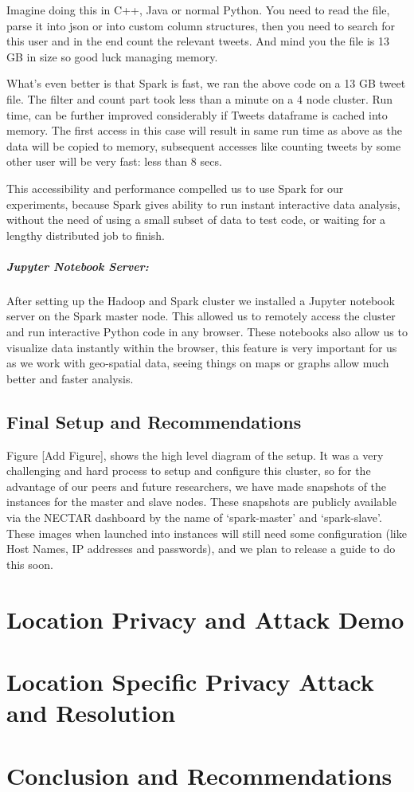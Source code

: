 \documentclass[12pt]{report}
\begin{document}
\inputminted{python}{sparkCount.py}

Imagine doing this in C++, Java or normal Python. You need to read the file, parse it into json or into custom column structures, then you need to search for this user and in the end count the relevant tweets. And mind you the file is 13 GB in size so good luck managing memory.

What's even better is that Spark is fast, we ran the above code on a 13 GB tweet file. The filter and count part took less than a minute on a 4 node cluster. Run time, can be further improved considerably if Tweets dataframe is cached into memory. The first access in this case will result in same run time as above as the data will be copied to memory, subsequent accesses like counting tweets by some other user will be very fast: less than 8 secs.

This accessibility and performance compelled us to use Spark for our experiments, because Spark gives ability to run instant interactive data analysis, without the need of using a small subset of data to test code, or waiting for a lengthy distributed job to finish.


\paragraph{Jupyter Notebook Server:\\}
After setting up the Hadoop and Spark cluster we installed a Jupyter notebook server on the Spark master node. This allowed us to remotely access the cluster and run interactive Python code in any browser. These notebooks also allow us to visualize data instantly within the browser, this feature is very important for us as we work with geo-spatial data, seeing things on maps or graphs allow much better and faster analysis.

\section{Final Setup and Recommendations}
Figure [Add Figure], shows the high level diagram of the setup. It was a very challenging and hard process to setup and configure this cluster, so for the advantage of our peers and future researchers, we have made snapshots of the instances for the master and slave nodes. These snapshots are publicly available via the NECTAR dashboard by the name of `spark-master' and `spark-slave'. These images when launched into instances will still need some configuration (like Host Names, IP addresses and passwords), and we plan to release a guide to do this soon.





\chapter{Location Privacy and Attack Demo }

\chapter{Location Specific Privacy Attack and Resolution}




\chapter{Conclusion and Recommendations}




\end{document}
